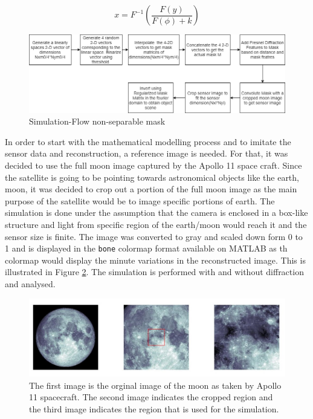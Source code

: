 \begin{equation}
\label{eq:conv5}
x = F^{-1}(\frac{F(y)}{F(\phi)+k})
\end{equation}
\begin{figure}[ht]
\includegraphics[scale = 0.50]{pics/non_sep_sim_flow}
\caption{Simulation-Flow non-separable mask}
\label{fig:non_sep_sim}
\end{figure}

In order to start with the mathematical modelling process and to imitate the sensor data and reconstruction, a reference image is needed. For that, it was decided to use the full moon image captured by the Apollo 11 space craft\cite{MoonImage}. Since the satellite is going to be pointing towards astronomical objects like the earth, moon, it was decided to crop out a portion of the full moon image as the main purpose of the satellite would be to image specific portions of earth. The simulation is done under the assumption that the camera is enclosed in a box-like structure and light from specific region of the earth/moon would reach it and the sensor size is finite. The image was converted to gray and scaled down form 0 to 1 and is displayed in the \texttt{bone} colormap format available on MATLAB as th colormap would display the minute variations in the reconstructed image. This is illustrated in Figure \ref{fig:moon_image}. The simulation is performed with and without diffraction and analysed. 
\begin{figure}[ht]
\includegraphics[scale = 0.50]{pics/MoonImagePortion}
\caption{The first image is the orginal image of the moon as taken by Apollo 11 spacecraft. The second image indicates the cropped region and the third image indicates the region that is used for the simulation.}
\label{fig:moon_image}
\end{figure}

